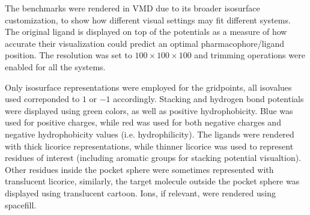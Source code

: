   The benchmarks were rendered in VMD due to its broader isosurface customization, to show how different visual settings may fit different systems. The original ligand is displayed on top of the potentials as a measure of how accurate their visualization could predict an optimal pharmacophore/ligand position. The resolution was set to $100 \times 100 \times 100$ and trimming operations were enabled for all the systems.

  Only isosurface representations were employed for the gridpoints, all isovalues used correponded to $1$ or $-1$ accordingly. Stacking and hydrogen bond potentials were displayed using green colors, as well as positive hydrophobicity. Blue was used for positive charges, while red was used for both negative charges and negative hydrophobicity values (i.e. hydrophilicity). The ligands were rendered with thick licorice representations, while thinner licorice was used to represent residues of interest (including aromatic groups for stacking potential visualtion). Other residues inside the pocket sphere were sometimes represented with translucent licorice, similarly, the target molecule outside the pocket sphere was displayed using translucent cartoon. Ions, if relevant, were rendered using spacefill.


